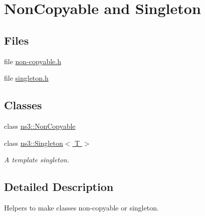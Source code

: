\hypertarget{group__access}{}\section{Non\+Copyable and Singleton}
\label{group__access}
\subsection*{Files}
\begin{DoxyCompactItemize}
\item 
file \hyperlink{non-copyable_8h}{non-\/copyable.\+h}
\item 
file \hyperlink{singleton_8h}{singleton.\+h}
\end{DoxyCompactItemize}
\subsection*{Classes}
\begin{DoxyCompactItemize}
\item 
class \hyperlink{classns3_1_1NonCopyable}{ns3\+::\+Non\+Copyable}
\item 
class \hyperlink{classns3_1_1Singleton}{ns3\+::\+Singleton$<$ T $>$}
\begin{DoxyCompactList}\small\item\em A template singleton. \end{DoxyCompactList}\end{DoxyCompactItemize}


\subsection{Detailed Description}
Helpers to make classes non-\/copyable or singleton. 